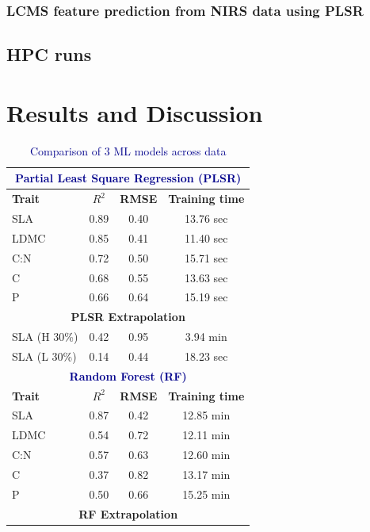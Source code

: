 \documentclass[12pt,a4paper]{report}
\begin{document}
\subsection{LCMS feature prediction from NIRS data using PLSR}




\section{HPC runs}


\chapter{Results and Discussion}



\begin{table}[h!]
\centering
\caption{\textcolor{darkblue}{Comparison of 3 ML models across data}}
\label{tab:main-sub-table}
\begin{tabular}{lccc}
\toprule
\multicolumn{4}{c}{\textbf{\textcolor{darkblue}{Partial Least Square Regression (PLSR)}}} \\ 
\midrule
\textbf{Trait} & \textbf{$R^2$} & \textbf{RMSE} & \textbf{Training time} \\
\midrule
SLA  & 0.89 & 0.40 & 13.76 sec \\
LDMC & 0.85 & 0.41 & 11.40 sec \\
C:N  & 0.72 & 0.50 & 15.71 sec \\
C    & 0.68 & 0.55 & 13.63 sec \\
P    & 0.66 & 0.64 & 15.19 sec \\
\midrule
\multicolumn{4}{c}{\textbf{{PLSR Extrapolation}}} \\ 
\midrule
SLA (H 30\%) & 0.42 & 0.95 &  3.94 min \\
SLA  (L 30\%)& 0.14 & 0.44 &  18.23 sec \\
\midrule
\multicolumn{4}{c}{\textbf{\textcolor{darkblue}{Random Forest (RF)}}} \\ 
\midrule
\textbf{Trait} & \textbf{$R^2$} & \textbf{RMSE} & \textbf{Training time} \\
\midrule
SLA  & 0.87 & 0.42 & 12.85 min \\
LDMC & 0.54 & 0.72 & 12.11 min \\
C:N  & 0.57 & 0.63 & 12.60 min \\
C    & 0.37 & 0.82 & 13.17 min \\
P    & 0.50 & 0.66 & 15.25 min \\
\midrule
\multicolumn{4}{c}{\textbf{{RF Extrapolation}}} \\ 

\end{tabular}
\end{table}
\end{document}
